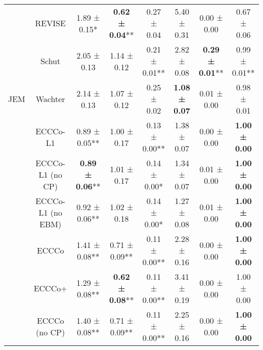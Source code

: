 \begin{table}
{\begin{tabular}[t]{cccccccc}
 & REVISE & 1.89 ± 0.15*\hphantom{*} & \textbf{0.62 ± 0.04}** & 0.27 ± 0.04\hphantom{*}\hphantom{*} & 5.40 ± 0.31\hphantom{*}\hphantom{*} & 0.00 ± 0.00\hphantom{*}\hphantom{*} & 0.67 ± 0.06\hphantom{*}\hphantom{*}\\

 & Schut & 2.05 ± 0.13\hphantom{*}\hphantom{*} & 1.14 ± 0.12\hphantom{*}\hphantom{*} & 0.21 ± 0.01** & 2.82 ± 0.08\hphantom{*}\hphantom{*} & \textbf{0.29 ± 0.01}** & 0.99 ± 0.01**\\

\multirow[t]{-10}{*}{\centering\arraybackslash JEM} & Wachter & 2.14 ± 0.13\hphantom{*}\hphantom{*} & 1.07 ± 0.12\hphantom{*}\hphantom{*} & 0.25 ± 0.02\hphantom{*}\hphantom{*} & \textbf{1.08 ± 0.07}\hphantom{*}\hphantom{*} & 0.01 ± 0.00\hphantom{*}\hphantom{*} & 0.98 ± 0.01\hphantom{*}\hphantom{*}\\
\cmidrule{1-8}
 & ECCCo-L1 & 0.89 ± 0.05** & 1.00 ± 0.17\hphantom{*}\hphantom{*} & 0.13 ± 0.00** & 1.38 ± 0.07\hphantom{*}\hphantom{*} & 0.00 ± 0.00\hphantom{*}\hphantom{*} & \textbf{1.00 ± 0.00}\hphantom{*}\hphantom{*}\\

 & ECCCo-L1 (no CP) & \textbf{0.89 ± 0.06}** & 1.01 ± 0.17\hphantom{*}\hphantom{*} & 0.14 ± 0.00*\hphantom{*} & 1.34 ± 0.07\hphantom{*}\hphantom{*} & 0.01 ± 0.00\hphantom{*}\hphantom{*} & \textbf{1.00 ± 0.00}\hphantom{*}\hphantom{*}\\

 & ECCCo-L1 (no EBM) & 0.92 ± 0.06** & 1.02 ± 0.18\hphantom{*}\hphantom{*} & 0.14 ± 0.00*\hphantom{*} & 1.27 ± 0.08\hphantom{*}\hphantom{*} & 0.01 ± 0.00\hphantom{*}\hphantom{*} & \textbf{1.00 ± 0.00}\hphantom{*}\hphantom{*}\\

 & ECCCo & 1.41 ± 0.08** & 0.71 ± 0.09** & 0.11 ± 0.00** & 2.28 ± 0.16\hphantom{*}\hphantom{*} & 0.00 ± 0.00\hphantom{*}\hphantom{*} & \textbf{1.00 ± 0.00}\hphantom{*}\hphantom{*}\\

 & ECCCo+ & 1.29 ± 0.08** & \textbf{0.62 ± 0.08}** & 0.11 ± 0.00** & 3.41 ± 0.19\hphantom{*}\hphantom{*} & 0.00 ± 0.00\hphantom{*}\hphantom{*} & 1.00 ± 0.00\hphantom{*}\hphantom{*}\\

 & ECCCo (no CP) & 1.40 ± 0.08** & 0.71 ± 0.09** & 0.11 ± 0.00** & 2.25 ± 0.16\hphantom{*}\hphantom{*} & 0.00 ± 0.00\hphantom{*}\hphantom{*} & \textbf{1.00 ± 0.00}\hphantom{*}\hphantom{*}\\


\end{tabular}}
\end{table}
